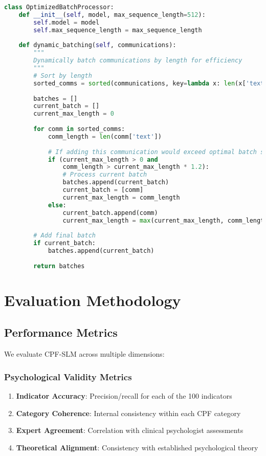 \documentclass[11pt,a4paper]{article}
\begin{document}
\begin{lstlisting}[language=Python, caption=Batch Optimization]
class OptimizedBatchProcessor:
    def __init__(self, model, max_sequence_length=512):
        self.model = model
        self.max_sequence_length = max_sequence_length
        
    def dynamic_batching(self, communications):
        """
        Dynamically batch communications by length for efficiency
        """
        # Sort by length
        sorted_comms = sorted(communications, key=lambda x: len(x['text']))
        
        batches = []
        current_batch = []
        current_max_length = 0
        
        for comm in sorted_comms:
            comm_length = len(comm['text'])
            
            # If adding this communication would exceed optimal batch size
            if (current_max_length > 0 and 
                comm_length > current_max_length * 1.2):
                # Process current batch
                batches.append(current_batch)
                current_batch = [comm]
                current_max_length = comm_length
            else:
                current_batch.append(comm)
                current_max_length = max(current_max_length, comm_length)
        
        # Add final batch
        if current_batch:
            batches.append(current_batch)
            
        return batches
\end{lstlisting}

\section{Evaluation Methodology}

\subsection{Performance Metrics}

We evaluate CPF-SLM across multiple dimensions:

\subsubsection{Psychological Validity Metrics}

\begin{enumerate}
\item \textbf{Indicator Accuracy}: Precision/recall for each of the 100 indicators
\item \textbf{Category Coherence}: Internal consistency within each CPF category
\item \textbf{Expert Agreement}: Correlation with clinical psychologist assessments
\item \textbf{Theoretical Alignment}: Consistency with established psychological theory
\end{enumerate}
\end{document}
